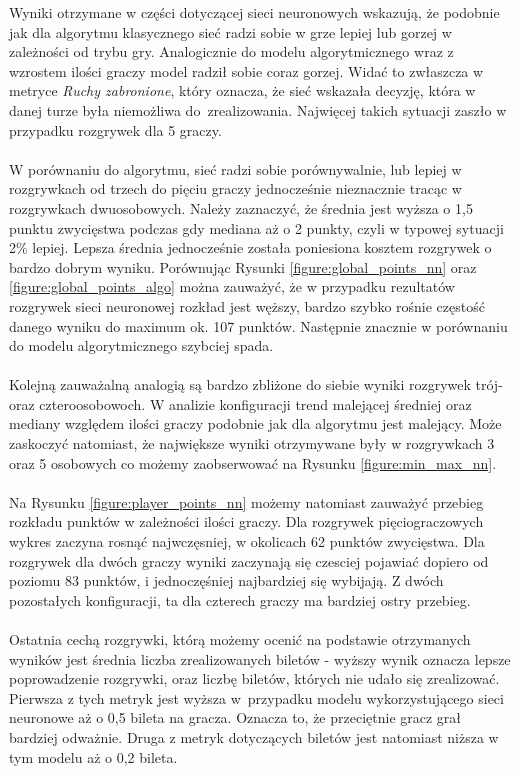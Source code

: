 \documentclass[12pt, oneside]{report}
\begin{document}
Wyniki otrzymane w części dotyczącej sieci neuronowych wskazują, że podobnie jak dla algorytmu klasycznego sieć radzi sobie w grze lepiej lub gorzej w zależności od trybu gry. Analogicznie do modelu algorytmicznego wraz z wzrostem ilości graczy model radził sobie coraz gorzej. Widać to zwłaszcza w metryce \textit{Ruchy zabronione}, który oznacza, że sieć wskazała decyzję, która w danej turze była niemożliwa do~zrealizowania. Najwięcej takich sytuacji zaszło w przypadku rozgrywek dla 5 graczy. \\ \\
W porównaniu do algorytmu, sieć radzi sobie porównywalnie, lub lepiej w rozgrywkach od trzech do pięciu graczy jednocześnie nieznacznie tracąc w rozgrywkach dwuosobowych. Należy zaznaczyć, że średnia jest wyższa o 1,5 punktu zwycięstwa podczas gdy mediana aż o 2 punkty, czyli w typowej sytuacji 2\% lepiej. Lepsza średnia jednocześnie została poniesiona kosztem rozgrywek o bardzo dobrym wyniku. Porównując Rysunki \ref{figure:global_points_nn} oraz \ref{figure:global_points_algo} można zauważyć, że w przypadku rezultatów rozgrywek sieci neuronowej rozkład jest węższy, bardzo szybko rośnie częstość danego wyniku do maximum ok. 107 punktów. Następnie znacznie w porównaniu do modelu algorytmicznego szybciej spada. \\ \\
Kolejną zauważalną analogią są bardzo zbliżone do siebie wyniki rozgrywek trój- oraz czteroosobowoch. W analizie konfiguracji trend malejącej średniej oraz mediany względem ilości graczy podobnie jak dla algorytmu jest malejący. Może zaskoczyć natomiast, że największe wyniki otrzymywane były w rozgrywkach 3 oraz 5 osobowych co możemy zaobserwować na Rysunku \ref{figure:min_max_nn}. \\ \\
Na Rysunku \ref{figure:player_points_nn} możemy natomiast zauważyć przebieg rozkładu punktów w zależności ilości graczy. Dla rozgrywek pięciograczowych wykres zaczyna rosnąć najwczęsniej, w okolicach 62 punktów zwycięstwa. Dla rozgrywek dla dwóch graczy wyniki zaczynają się czesciej pojawiać dopiero od poziomu 83 punktów, i jednoczęśniej najbardziej się wybijają. Z dwóch pozostałych konfiguracji, ta dla czterech graczy ma bardziej ostry przebieg. \\ \\
Ostatnia cechą rozgrywki, którą możemy ocenić na podstawie otrzymanych wyników jest średnia liczba zrealizowanych biletów - wyższy wynik oznacza lepsze poprowadzenie rozgrywki, oraz liczbę biletów, których nie udało się zrealizować. Pierwsza z tych metryk jest wyższa w~przypadku modelu wykorzystującego sieci neuronowe aż o 0,5 bileta na gracza. Oznacza to, że przeciętnie gracz grał bardziej odważnie. Druga z metryk dotyczących biletów jest natomiast niższa w tym modelu aż o 0,2 bileta. 
\end{document}
